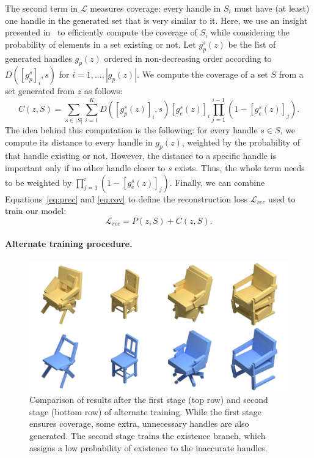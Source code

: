 The second term in $\mathcal{L}$ measures coverage:
every handle in $S_i$ must have (at least) one handle in the generated set that is very
similar to it.
Here, we use an insight presented in~\cite{Paschalidou2019} to efficiently compute the coverage of
$S_i$ while considering the probability of elements in a set existing or not.
Let $g_p^s(z)$ be the list of generated handles $g_p(z)$ ordered in non-decreasing
order according to $D([g_p^s]_i, s)$ for $i=1,...,|g_p(z)|$.
We compute the coverage of a set $S$ from a set generated from $z$ as follows:
\begin{equation}
    \label{eq:cov}
C(z, S) = \sum_{s \in |S|} \sum_{i=1}^{K}D([g_p^s(z)]_i, s)[g_e^s(z)]_i \prod_{j=1}^{i-1}(1 - [g_e^s(z)]_j).
\end{equation}
The idea behind this computation is the following:
for every handle $s \in S$, we compute its distance to every handle in $g_p(z)$, weighted
by the probability of that handle existing or not.
However, the distance to a specific handle is important only if no other handle closer to $s$ exists. Thus, the whole term needs to be weighted by $\prod_{j=1}^{i}(1 - [g_e^s(z)]_j)$.
Finally, we can combine Equations~\ref{eq:prec} and \ref{eq:cov} to define the
reconstruction loss $\mathcal{L}_{rec}$ used to train our model:
\begin{equation}
    \label{eq:rec}
    \mathcal{L}_{rec} = P(z, S) + C(z, S).
\end{equation}

\paragraph{Alternate training procedure.}
\begin{figure}
\centering
\includegraphics[width=0.8\linewidth]{handles/imgs/stagecomp.pdf}
\caption{\label{fig:alttrain} \small
Comparison of results after the first stage (top row) and second
stage (bottom row) of alternate training.
While the first stage ensures coverage, some extra, unnecessary handles are also generated.
The second stage trains the existence branch, which assigns a low probability
of existence to the inaccurate handles.}
\end{figure}

